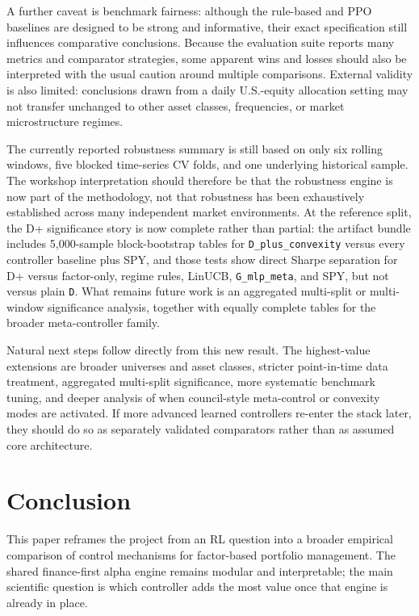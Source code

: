 \documentclass[11pt]{article}
\begin{document}
A further caveat is benchmark fairness: although the rule-based and PPO
baselines are designed to be strong and informative, their exact specification
still influences comparative conclusions. Because the evaluation suite reports
many metrics and comparator strategies, some apparent wins and losses should
also be interpreted with the usual caution around multiple comparisons.
External validity is also limited: conclusions drawn from a daily U.S.-equity
allocation setting may not transfer unchanged to other asset classes,
frequencies, or market microstructure regimes.

The currently reported robustness summary is still based on only six rolling
windows, five blocked time-series CV folds, and one underlying historical
sample. The workshop interpretation should therefore be that the robustness
engine is now part of the methodology, not that robustness has been exhaustively
established across many independent market environments. At the reference
split, the D+ significance story is now complete rather than partial: the
artifact bundle includes 5{,}000-sample block-bootstrap tables for
\texttt{D\_plus\_convexity} versus every controller baseline plus SPY, and
those tests show direct Sharpe separation for D+ versus factor-only, regime
rules, LinUCB, \texttt{G\_mlp\_meta}, and SPY, but not versus plain
\texttt{D}. What remains future work is an aggregated multi-split or
multi-window significance analysis, together with equally complete tables for
the broader meta-controller family.

Natural next steps follow directly from this new result. The highest-value
extensions are broader universes and asset classes, stricter point-in-time data
treatment, aggregated multi-split significance, more systematic benchmark
tuning, and deeper analysis of when council-style meta-control or convexity
modes are activated. If more advanced learned
controllers re-enter the stack later, they should do so as separately validated
comparators rather than as assumed core architecture.

\section{Conclusion}

This paper reframes the project from an RL question into a broader empirical
comparison of control mechanisms for factor-based portfolio management. The
shared finance-first alpha engine remains modular and interpretable; the main
scientific question is which controller adds the most value once that engine is
already in place.
\end{document}
